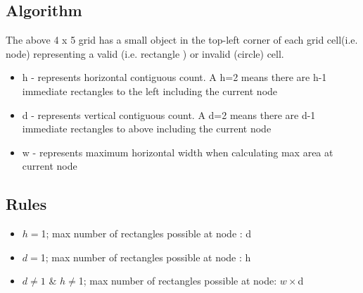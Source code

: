 \documentclass[a4paper,11pt]{article}
\begin{document}
    \subsection{Algorithm}
    The above 4 x 5 grid has a small object in the top-left corner of each grid cell(i.e. node) representing a valid (i.e. rectangle ) or invalid (circle) cell. 
    \begin{itemize}

        \item h - represents horizontal contiguous count. A h=2 means there are h-1 immediate rectangles to the left including the current node
        \item d - represents vertical contiguous count. A d=2 means there are d-1 immediate rectangles to above including the current node
        \item w - represents maximum horizontal width when calculating max area at current node 
        
        
    \end{itemize}
    
    \subsection{Rules}
    \begin{itemize}
        \item $h = $1; max number of rectangles possible at node : d
        \item $d = $1; max number of rectangles possible at node : h
        \item $d \neq 1$ \& $h \neq $1; max number of rectangles possible at node: $w \times $d

    \end{itemize}



\end{document}
